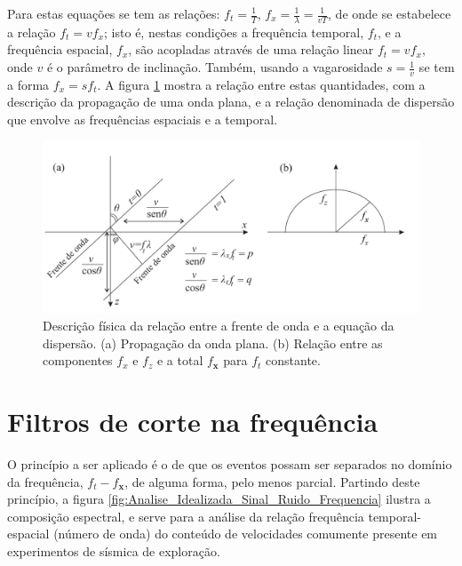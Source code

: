 Para estas equações se tem as relações: $f_{t}=\frac{1}{T} $, $f_{x}=\frac{1}{\lambda}=\frac{1}{vT}$, de onde se estabelece a relação $f_{t}=vf_{x}$; isto é, nestas condições a frequência temporal, $f_{t}$, e a frequência espacial, $f_{x}$, são acopladas através de uma relação linear $f_{t}=vf_{x}$, onde $v$ é o parâmetro de inclinação.
Também, usando a vagarosidade $s=\frac{1}{v}$ se tem a forma $f_{x}=sf_{t}$. 
A figura \ref{fig:Relacao_Dispersao} mostra a relação entre estas quantidades, com a descrição da propagação de uma onda plana, e a relação denominada de dispersão que envolve as frequências espaciais e a temporal.

\begin{figure}[H]
\centering
\includegraphics[width=12cm]{figuras/cap3/Relacao_Dispersao.pdf}
\vspace{-0.3cm}
\caption{Descrição física da relação entre a frente de onda e a equação da dispersão. 
(a) Propagação da onda plana. 
(b) Relação entre as componentes $f_{x}$ e $f_{z}$ e a total $f_{\mathbf{x}}$ para $f_{t}$ constante.}
\label{fig:Relacao_Dispersao}
\end{figure}

\section{Filtros de corte na frequência}

O princípio a ser aplicado é o de que os eventos possam ser separados no domínio da frequência, $f_{t}-f_{\mathbf{x}}$, de alguma forma, pelo menos parcial.  
Partindo deste princípio, a figura \ref{fig:Analise_Idealizada_Sinal_Ruido_Frequencia} ilustra a composição espectral, e serve para a análise da relação frequência temporal-espacial (número de onda) do conteúdo de velocidades comumente presente em experimentos de sísmica de exploração.

